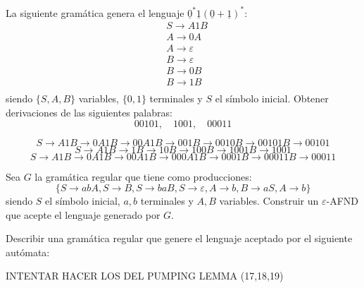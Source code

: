 \documentclass[twoside]{article}
\begin{document}
\newpage

\begin{ejercicio}{14}
La siguiente gramática genera el lenguaje $\underline{0}^*\underline{1}(\underline{0} + \underline{1})^*$:
\begin{align*}
&S \rightarrow A1B\\
&A \rightarrow 0A\\
&A \rightarrow \varepsilon\\
&B \rightarrow \varepsilon\\
&B \rightarrow 0B\\
&B \rightarrow 1B\\
\end{align*}
siendo $\{S, A,B\}$ variables, $\{0, 1\}$ terminales y $S$ el símbolo inicial. Obtener derivaciones de las siguientes
palabras:
$$00101,\quad 1001,\quad 00011$$
\end{ejercicio}
\begin{solucion}
$$
S \rightarrow A1B \rightarrow 0A1B \rightarrow 00A1B \rightarrow 001B \rightarrow 0010B \rightarrow 00101B \rightarrow 00101
$$
$$
S \rightarrow A1B \rightarrow 1B\rightarrow 10B\rightarrow 100B\rightarrow 1001B\rightarrow 1001
$$
$$
S \rightarrow A1B \rightarrow 0A1B\rightarrow 00A1B\rightarrow 000A1B\rightarrow 0001B\rightarrow 00011B\rightarrow 00011
$$
\end{solucion}

\newpage

\begin{ejercicio}{15}
Sea $G$ la gramática regular que tiene como producciones:
$$\{S \rightarrow abA, S \rightarrow B, S \rightarrow baB, S \rightarrow \varepsilon, A \rightarrow b, B \rightarrow aS, A \rightarrow b\}$$
siendo $S$ el símbolo inicial, $a, b$ terminales y $A,B$ variables. Construir un $\varepsilon$-AFND que acepte el
lenguaje generado por $G$.
\end{ejercicio}
\begin{solucion}
\end{solucion}

\newpage

\begin{ejercicio}{16}
Describir una gramática regular que genere el lenguaje aceptado por el siguiente
autómata:
\end{ejercicio}
\begin{solucion}
\end{solucion}

INTENTAR HACER LOS DEL PUMPING LEMMA (17,18,19)
\end{document}
